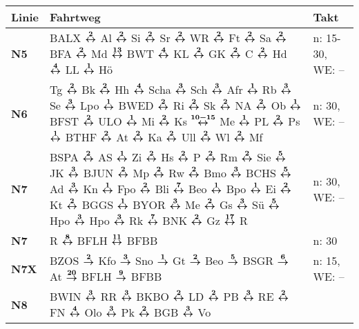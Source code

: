 \begin{minipage}[t]{0.05\textwidth}
\phantom{Tor}
\end{minipage}
\begin{minipage}[t]{0.45\textwidth}
\begin{tabular}{>{\bfseries}L{1.2cm}L{9.0cm}L{3.0cm}}
{\bfseries Linie} & {\bfseries Fahrtweg} & {\bfseries Takt} \\
\hline
\nbus{} N5    & BALX $\xarwe{2}$ Al $\xarwe{2}$ Si $\xarwe{2}$ Sr $\xarwe{2}$ WR $\xarwe{2}$ Ft $\xarwe{2}$ Sa $\xarwe{2}$ BFA $\xarwe{2}$ Md $\xarwe{13}$ BWT $\xarwe{4}$ KL     %
                $\xarwe{2}$ GK $\xarwe{2}$ C $\xarwe{2}$ Hd $\xarwe{4}$ LL $\xarwe{1}$ Hö
                & n: 15-30, WE: --           \\
\nbus{} N6    & Tg $\xarwe{2}$ Bk $\xarwe{2}$ Hh $\xarwe{4}$ Scha $\xarwe{3}$ Sch $\xarwe{3}$ Afr $\xarwe{1}$ Rb $\xarwe{3}$ Se $\xarwe{3}$ Lpo $\xarwe{1}$ BWED $\xarwe{2}$ Ri     %
                $\xarwe{2}$ Sk $\xarwe{2}$ NA $\xarwe{2}$ Ob $\xarwe{1}$ BFST $\xarwe{2}$ ULO $\xarwe{1}$ Mi $\xarwe{2}$ Ks $\xarwe{10-15}$ Me $\xarwe{1}$ PL $\xarwe{2}$ Ps        %
                $\xarwe{1}$ BTHF $\xarwe{2}$ At $\xarwe{2}$ Ka $\xarwe{2}$ Ull $\xarwe{2}$ Wl $\xarwe{2}$ Mf                                                                        & n: 30, WE: --              \\
\nbus{} N7    & BSPA $\xarwe{2}$ AS $\xarwe{1}$ Zi $\xarwe{2}$ Hs $\xarwe{2}$ P $\xarwe{2}$ Rm $\xarwe{2}$ Sie $\xarwe{5}$ JK $\xarwe{3}$ BJUN $\xarwe{2}$ Mp $\xarwe{2}$ Rw        %
                $\xarwe{2}$ Bmo $\xarwe{3}$ BCHS $\xarwe{5}$ Ad $\xarwe{3}$ Kn $\xarwe{1}$ Fpo $\xarwe{2}$ Bli $\xarwe{7}$ Beo $\xarwe{1}$ Bpo $\xarwe{1}$ Ei $\xarwe{2}$ Kt        %
                $\xarwe{2}$ BGGS $\xarwe{1}$ BYOR $\xarwe{3}$ Me $\xarwe{2}$ Gs $\xarwe{3}$ Sü $\xarwe{5}$ Hpo $\xarwe{3}$ Hpo $\xarwe{3}$ Rk $\xarwe{7}$ BNK $\xarwe{2}$ Gz        %
                $\xarwe{17}$ R                                                                                                                                                      & n: 30, WE: --              \\
\nbus{} N7    & R $\xarwe{8}$ BFLH $\xarwe{11}$ BFBB
& n: 30                      \\
\nbus{} N7X   & BZOS $\xarre{2}$ Kfo $\xarre{3}$ Sno $\xarre{1}$ Gt $\xarre{2}$ Beo $\xarre{5}$ BSGR $\xarre{6}$ At $\xarre{20}$ BFLH
$\xarre{9}$ BFBB & n: 15, WE: -- \\
\nbus{} N8    & BWIN $\xarwe{3}$ RR $\xarwe{3}$ BKBO $\xarwe{2}$ LD $\xarwe{2}$ PB $\xarwe{3}$ RE $\xarwe{2}$ FN $\xarwe{4}$ Olo $\xarwe{3}$ Pk $\xarwe{2}$ BGB $\xarwe{3}$ Vo      %

\end{tabular}
\end{minipage}
